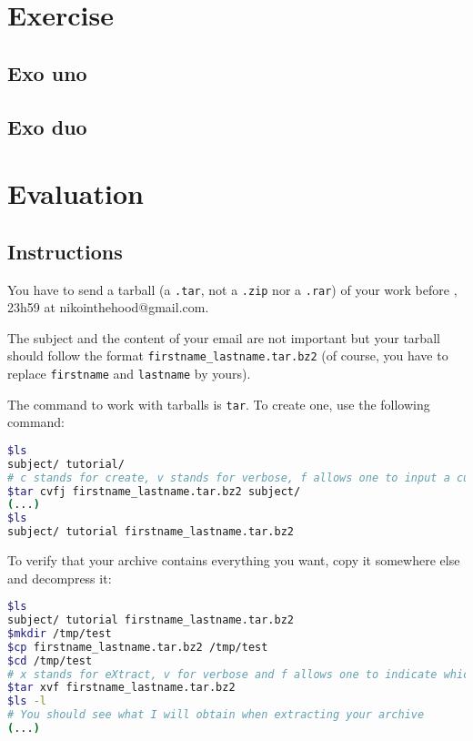 \documentclass[12pt]{article}
\begin{document}
\section{Exercise}
\subsection{Exo uno}
\subsection{Exo duo}

\section{Evaluation}
\subsection{Instructions}

You have to send a tarball (a \texttt{.tar}, not a \texttt{.zip} nor a \texttt{.rar}) of your work before , 23h59 at nikointhehood@gmail.com.

The subject and the content of your email are not important but your tarball should follow the format \texttt{firstname\_lastname.tar.bz2} (of course, you have to replace \texttt{firstname} and \texttt{lastname} by yours).

The command to work with tarballs is \texttt{tar}. To create one, use the following command:

\begin{lstlisting}[language=bash]
$ls
subject/ tutorial/
# c stands for create, v stands for verbose, f allows one to input a custom name for the archive and j indicates the usage of bzip2
$tar cvfj firstname_lastname.tar.bz2 subject/
(...)
$ls
subject/ tutorial firstname_lastname.tar.bz2
\end{lstlisting}

To verify that your archive contains everything you want, copy it somewhere else and decompress it:

\begin{lstlisting}[language=bash]
$ls
subject/ tutorial firstname_lastname.tar.bz2
$mkdir /tmp/test
$cp firstname_lastname.tar.bz2 /tmp/test
$cd /tmp/test
# x stands for eXtract, v for verbose and f allows one to indicate which file tar should work with
$tar xvf firstname_lastname.tar.bz2
$ls -l
# You should see what I will obtain when extracting your archive
(...)
\end{lstlisting}
\end{document}
